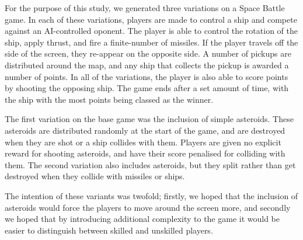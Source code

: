 For the purpose of this study, we generated three variations on a Space Battle game. In each of these variations, players are made to control a ship and compete against an AI-controlled oponent. The player is able to control the rotation of the ship, apply thrust, and fire a finite-number of missiles. If the player travels off the side of the screen, they re-appear on the opposite side. A number of pickups are distributed around the map, and any ship that collects the pickup is awarded a number of points. In all of the variations, the player is also able to score points by shooting the opposing ship. The game ends after a set amount of time, with the ship with the most points being classed as the winner.

The first variation on the base game was the inclusion of simple asteroids. These asteroids are distributed randomly at the start of the game, and are destroyed when they are shot or a ship collides with them. Players are given no explicit reward for shooting asteroids, and have their score penalised for colliding with them. The second variation also includes asteroids, but they split rather than get destroyed when they collide with missiles or ships.

The intention of these variants was twofold; firstly, we hoped that the inclusion of asteroids would force the players to move around the screen more, and secondly we hoped that by introducing additional complexity to the game it would be easier to distinguish between skilled and unskilled players.

